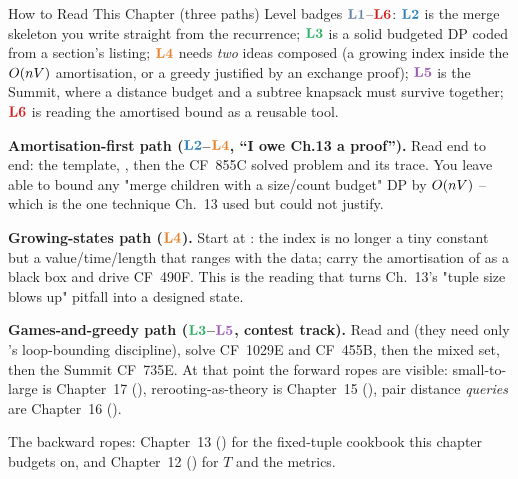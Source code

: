 \begin{chaptertheorybox}{How to Read This Chapter (three paths)}
Level badges $\lv1$--$\lv6$: $\lv2$ is the merge skeleton you write straight
from the recurrence; $\lv3$ is a solid budgeted DP coded from a section's
listing; $\lv4$ needs \emph{two} ideas composed (a growing index inside the
$O(nV)$ amortisation, or a greedy justified by an exchange proof);
$\lv5$ is the Summit, where a distance budget and a subtree knapsack must
survive together; $\lv6$ is reading the amortised bound as a reusable tool.

\textbf{Amortisation-first path ($\lv2$--$\lv{4}$, ``I owe Ch.13 a proof'').}
Read  end to end: the template, ,
then the CF~855C solved problem and its trace. You leave able to bound any
"merge children with a size/count budget" DP by $O(nV)$ -- which is the
one technique Ch.~13 used but could not justify.

\textbf{Growing-states path ($\lv4$).} Start at : the
index is no longer a tiny constant but a value/time/length that ranges with
the data; carry the amortisation of  as a black box and
drive CF~490F. This is the reading that turns Ch.~13's "tuple size blows up"
pitfall into a designed state.

\textbf{Games-and-greedy path ($\lv3$--$\lv{5}$, contest track).} Read
 and  (they need only 's
loop-bounding discipline), solve CF~1029E and CF~455B, then the mixed set,
then the Summit CF~735E. At that point the forward ropes are visible:
small-to-large is Chapter~17 (), rerooting-as-theory is
Chapter~15 (), pair distance \emph{queries} are Chapter~16 ().

The backward ropes: Chapter~13 () for the fixed-tuple cookbook this
chapter budgets on, and Chapter~12 () for $T$ and the metrics.
\end{chaptertheorybox}

